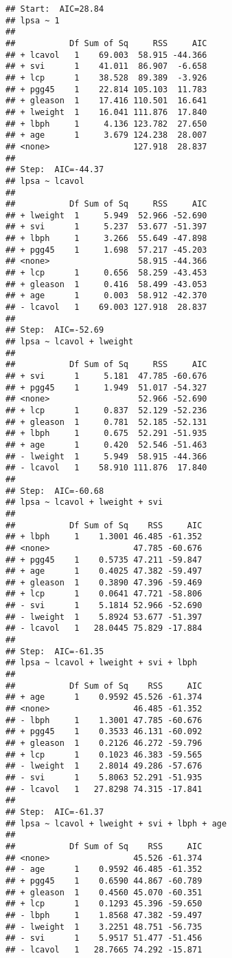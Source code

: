 \documentclass[
]{article}
\begin{document}
\begin{enumerate}
\begin{verbatim}
## Start:  AIC=28.84
## lpsa ~ 1
## 
##           Df Sum of Sq     RSS     AIC
## + lcavol   1    69.003  58.915 -44.366
## + svi      1    41.011  86.907  -6.658
## + lcp      1    38.528  89.389  -3.926
## + pgg45    1    22.814 105.103  11.783
## + gleason  1    17.416 110.501  16.641
## + lweight  1    16.041 111.876  17.840
## + lbph     1     4.136 123.782  27.650
## + age      1     3.679 124.238  28.007
## <none>                 127.918  28.837
## 
## Step:  AIC=-44.37
## lpsa ~ lcavol
## 
##           Df Sum of Sq     RSS     AIC
## + lweight  1     5.949  52.966 -52.690
## + svi      1     5.237  53.677 -51.397
## + lbph     1     3.266  55.649 -47.898
## + pgg45    1     1.698  57.217 -45.203
## <none>                  58.915 -44.366
## + lcp      1     0.656  58.259 -43.453
## + gleason  1     0.416  58.499 -43.053
## + age      1     0.003  58.912 -42.370
## - lcavol   1    69.003 127.918  28.837
## 
## Step:  AIC=-52.69
## lpsa ~ lcavol + lweight
## 
##           Df Sum of Sq     RSS     AIC
## + svi      1     5.181  47.785 -60.676
## + pgg45    1     1.949  51.017 -54.327
## <none>                  52.966 -52.690
## + lcp      1     0.837  52.129 -52.236
## + gleason  1     0.781  52.185 -52.131
## + lbph     1     0.675  52.291 -51.935
## + age      1     0.420  52.546 -51.463
## - lweight  1     5.949  58.915 -44.366
## - lcavol   1    58.910 111.876  17.840
## 
## Step:  AIC=-60.68
## lpsa ~ lcavol + lweight + svi
## 
##           Df Sum of Sq    RSS     AIC
## + lbph     1    1.3001 46.485 -61.352
## <none>                 47.785 -60.676
## + pgg45    1    0.5735 47.211 -59.847
## + age      1    0.4025 47.382 -59.497
## + gleason  1    0.3890 47.396 -59.469
## + lcp      1    0.0641 47.721 -58.806
## - svi      1    5.1814 52.966 -52.690
## - lweight  1    5.8924 53.677 -51.397
## - lcavol   1   28.0445 75.829 -17.884
## 
## Step:  AIC=-61.35
## lpsa ~ lcavol + lweight + svi + lbph
## 
##           Df Sum of Sq    RSS     AIC
## + age      1    0.9592 45.526 -61.374
## <none>                 46.485 -61.352
## - lbph     1    1.3001 47.785 -60.676
## + pgg45    1    0.3533 46.131 -60.092
## + gleason  1    0.2126 46.272 -59.796
## + lcp      1    0.1023 46.383 -59.565
## - lweight  1    2.8014 49.286 -57.676
## - svi      1    5.8063 52.291 -51.935
## - lcavol   1   27.8298 74.315 -17.841
## 
## Step:  AIC=-61.37
## lpsa ~ lcavol + lweight + svi + lbph + age
## 
##           Df Sum of Sq    RSS     AIC
## <none>                 45.526 -61.374
## - age      1    0.9592 46.485 -61.352
## + pgg45    1    0.6590 44.867 -60.789
## + gleason  1    0.4560 45.070 -60.351
## + lcp      1    0.1293 45.396 -59.650
## - lbph     1    1.8568 47.382 -59.497
## - lweight  1    3.2251 48.751 -56.735
## - svi      1    5.9517 51.477 -51.456
## - lcavol   1   28.7665 74.292 -15.871
\end{verbatim}


\end{enumerate}
\end{document}
